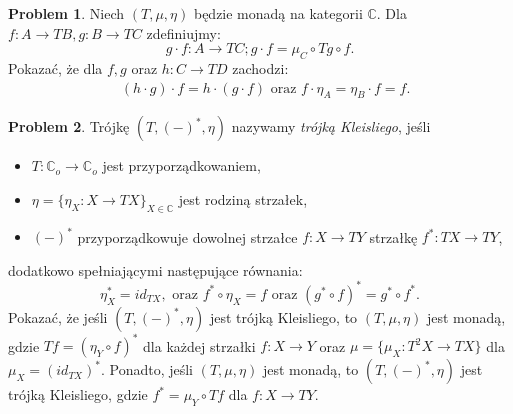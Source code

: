 \documentclass[10pt]{amsart}
\theoremstyle{plain}
\theoremstyle{definition}
\newtheorem{problem}{Problem}
\numberwithin{equation}{section}
\begin{document}
\begin{problem}
  Niech $(T,\mu,\eta)$ będzie monadą na kategorii $\mathbb{C}$. Dla $f:A\to TB, g:B\to TC$ zdefiniujmy:
  $$ g \cdot f :A\to TC; g\cdot f = \mu_C \circ Tg \circ f .$$ 
  Pokazać, że dla $f,g$ oraz $h:C\to TD$ zachodzi:
  \begin{align*}
    & (h\cdot g)\cdot f = h\cdot (g\cdot f) \text{ oraz } f\cdot \eta_A = \eta_B\cdot f = f.  
  \end{align*}
\end{problem}

\begin{problem}
 Trójkę $(T,(-)^\ast, \eta)$ nazywamy \emph{trójką Kleisliego}, jeśli
 \begin{itemize}
   \item $T:\mathbb{C}_o\to \mathbb{C}_o$ jest przyporządkowaniem,
   \item $\eta= \{\eta_X:X\to TX\}_{X\in \mathbb{C}}$ jest rodziną strzałek,
   \item $(-)^\ast$ przyporządkowuje dowolnej strzałce $f:X\to TY$ strzałkę $f^\ast :TX\to TY$, 
  \end{itemize}
 dodatkowo spełniającymi następujące równania:
 \[ 
   \eta_X^\ast = id_{TX}, \text{ oraz } f^\ast \circ \eta_X = f \text{ oraz } 
    (g^\ast \circ f)^\ast = g^\ast \circ f^\ast.
 \]
 Pokazać, że jeśli $(T, (-)^\ast, \eta)$ jest trójką Kleisliego, to $(T,\mu,\eta)$ jest monadą, gdzie $Tf = (\eta_Y\circ f)^\ast$ 
 dla każdej strzałki $f:X\to Y$ oraz
 $\mu = \{\mu_X:T^2X\to TX\}$ dla $\mu_X = (id_{TX})^\ast$. 
 Ponadto, jeśli $(T,\mu, \eta)$ jest monadą, 
 to $(T,(-)^\ast, \eta)$ jest trójką Kleisliego, gdzie $f^\ast = \mu_Y \circ Tf$ dla $f:X\to TY$. 
\end{problem} 
\end{document}
